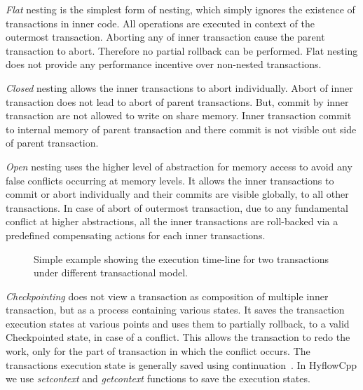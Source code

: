 \documentclass[12pt,english]{report}
\begin{document}
\textit{Flat} nesting is the simplest form of nesting, which simply ignores the existence of transactions in inner code. All operations are executed in context of the outermost transaction. Aborting any of inner transaction cause the parent transaction to abort. Therefore no partial rollback can be performed. Flat nesting does not provide any performance incentive over non-nested transactions.

\textit{Closed} nesting allows the inner transactions to abort individually. Abort of inner transaction does not lead to abort of parent transactions. But, commit by inner transaction are not allowed to write on share memory. Inner transaction commit to internal memory of parent transaction and there commit is not visible out side of parent transaction.

\textit{Open} nesting uses the higher level of abstraction for memory access to avoid any false conflicts occurring at memory levels. It allows the inner transactions to commit or abort individually and their commits are visible globally, to all other transactions. In case of abort of outermost transaction, due to any fundamental conflict at higher abstractions, all the inner transactions are roll-backed via a predefined compensating actions for each inner transactions.

\begin{figure}
\caption{Simple example showing the execution time-line for two transactions under different transactional model.}
\label{Fig:Nesting_example}
\end{figure}

\textit{Checkpointing} does not view a transaction as composition of multiple inner transaction, but as a process containing various states. It saves the transaction execution states at various points and uses them to partially rollback, to a valid Checkpointed state, in case of a conflict. This allows the transaction to redo the work, only for the part of transaction in which the conflict occurs. The transactions execution state is generally saved using continuation~\cite{flanagan1993essence}. In HyflowCpp we use \textit{setcontext} and \textit{getcontext} functions to save the execution states.     
\end{document}
